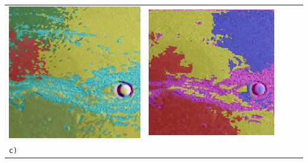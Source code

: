 \begin{table}[h!]
\begin{tabularx}{\textwidth}{>{\centering}m{}
			>{\centering}m{}
			>{\centering}m{}
			>{\centering}m{}
			>{\centering\arraybackslash}m{}}
		\includegraphics[width=0.9\linewidth]{images/gen/pooling_layers/p03_02.png_2.png} &
		\includegraphics[width=0.9\linewidth]{images/gen/pooling_layers/p03_02.png_4.png} \\
		\texttt{c)} &

\end{tabularx}
\end{table}
